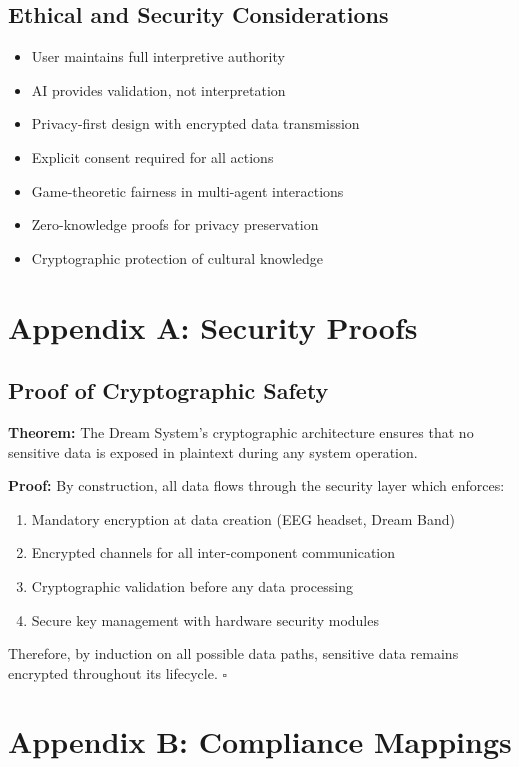 \documentclass[12pt,a4paper]{article}
\begin{document}
\subsection{Ethical and Security Considerations}
\begin{itemize}
    \item User maintains full interpretive authority
    \item AI provides validation, not interpretation
    \item Privacy-first design with encrypted data transmission
    \item Explicit consent required for all actions
    \item Game-theoretic fairness in multi-agent interactions
    \item Zero-knowledge proofs for privacy preservation
    \item Cryptographic protection of cultural knowledge
\end{itemize}

\section{Appendix A: Security Proofs}

\subsection{Proof of Cryptographic Safety}

\textbf{Theorem:} The Dream System's cryptographic architecture ensures that no sensitive data is exposed in plaintext during any system operation.

\textbf{Proof:} By construction, all data flows through the security layer which enforces:
\begin{enumerate}
    \item Mandatory encryption at data creation (EEG headset, Dream Band)
    \item Encrypted channels for all inter-component communication
    \item Cryptographic validation before any data processing
    \item Secure key management with hardware security modules
\end{enumerate}

Therefore, by induction on all possible data paths, sensitive data remains encrypted throughout its lifecycle. $\square$

\section{Appendix B: Compliance Mappings}
\end{document}
